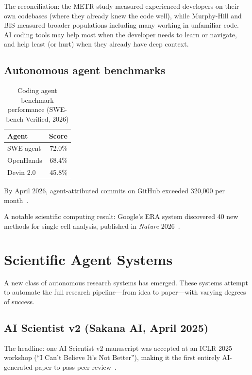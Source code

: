 \documentclass[11pt,a4paper]{article}
\begin{document}
The reconciliation: the METR study measured experienced developers on their own codebases (where they already knew the code well), while Murphy-Hill and BIS measured broader populations including many working in unfamiliar code. AI coding tools may help most when the developer needs to learn or navigate, and help least (or hurt) when they already have deep context.

\subsection{Autonomous agent benchmarks}

\begin{table}[h]
\centering
\caption{Coding agent benchmark performance (SWE-bench Verified, 2026)}
\label{tab:agents}
\begin{tabular}{lr}
\toprule
\textbf{Agent} & \textbf{Score} \\
\midrule
SWE-agent & 72.0\% \\
OpenHands & 68.4\% \\
Devin 2.0 & 45.8\% \\
\bottomrule
\end{tabular}
\end{table}

By April 2026, agent-attributed commits on GitHub exceeded 320,000 per month~\cite{robbes2026b}.

A notable scientific computing result: Google's ERA system discovered 40 new methods for single-cell analysis, published in \emph{Nature} 2026~\cite{googleera2026}.


\section{Scientific Agent Systems}
\label{sec:agents}

A new class of autonomous research systems has emerged. These systems attempt to automate the full research pipeline---from idea to paper---with varying degrees of success.

\subsection{AI Scientist v2 (Sakana AI, April 2025)}

The headline: one AI Scientist v2 manuscript was accepted at an ICLR 2025 workshop (``I Can't Believe It's Not Better''), making it the first entirely AI-generated paper to pass peer review~\cite{sakana2025v2}.
\end{document}

